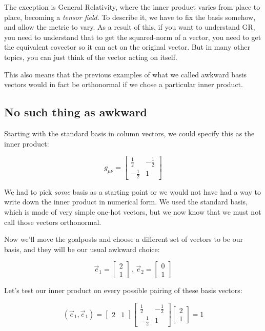 The exception is General Relativity, where the inner product varies from place to place, becoming a \textit{tensor field}. To describe it, we have to fix the basis somehow, and allow the metric to vary. As a result of this, if you want to understand GR, you need to understand that to get the squared-norm of a vector, you need to get the equivalent covector so it can act on the original vector. But in many other topics, you can just think of the vector acting on itself.

This also means that the previous examples of what we called awkward basis vectors would in fact be orthonormal if we chose a particular inner product.

\subsection{No such thing as awkward}

Starting with the standard basis in column vectors, we could specify this as the inner product:

$$
g_{\mu\nu} = 
\begin{bmatrix}
\frac{1}{2} & -\frac{1}{2} \\
-\frac{1}{2} & 1
\end{bmatrix}
$$

We had to pick \textit{some} basis as a starting point or we would not have had a way to write down the inner product in numerical form. We used the standard basis, which is made of very simple one-hot vectors, but we now know that we must not call those vectors orthonormal.

Now we'll move the goalposts and choose a different set of vectors to be our basis, and they will be our usual awkward choice:

$$
\vec{e}_1 = \begin{bmatrix}2 \\ 1\end{bmatrix}\,,\,
\vec{e}_2 = \begin{bmatrix}0 \\ 1\end{bmatrix}
$$

Let's test our inner product on every possible pairing of these basis vectors:

$$
(\vec{e}_1, \vec{e}_1) =
\begin{bmatrix}
2 & 1
\end{bmatrix}
\begin{bmatrix}
\frac{1}{2} & -\frac{1}{2} \\
-\frac{1}{2} & 1
\end{bmatrix}
\begin{bmatrix}
2 \\ 1
\end{bmatrix}
= 1
$$    

